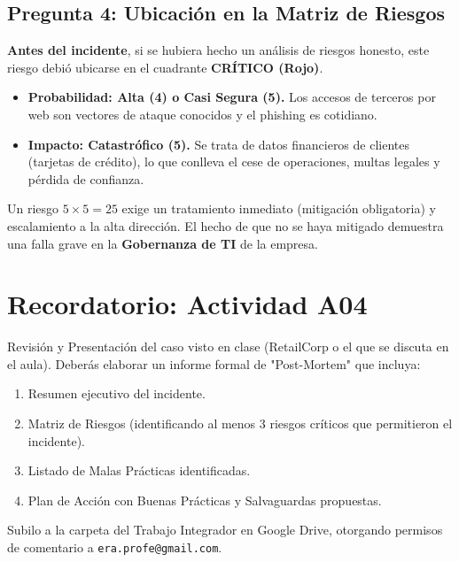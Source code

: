 \documentclass[11pt,a4paper]{article}
\begin{document}
\subsection*{Pregunta 4: Ubicación en la Matriz de Riesgos}
\begin{respuesta}
\textbf{Antes del incidente}, si se hubiera hecho un análisis de riesgos honesto, este riesgo debió ubicarse en el cuadrante \textbf{CRÍTICO (Rojo)}.
\begin{itemize}[leftmargin=*]
  \item \textbf{Probabilidad: Alta (4) o Casi Segura (5).} Los accesos de terceros por web son vectores de ataque conocidos y el phishing es cotidiano.
  \item \textbf{Impacto: Catastrófico (5).} Se trata de datos financieros de clientes (tarjetas de crédito), lo que conlleva el cese de operaciones, multas legales y pérdida de confianza.
\end{itemize}
Un riesgo $5 \times 5 = 25$ exige un tratamiento inmediato (mitigación obligatoria) y escalamiento a la alta dirección. El hecho de que no se haya mitigado demuestra una falla grave en la \textbf{Gobernanza de TI} de la empresa.
\end{respuesta}

\section{Recordatorio: Actividad A04}
\begin{clave}
Revisión y Presentación del caso visto en clase (RetailCorp o el que se discuta en el aula). 
Deberás elaborar un informe formal de "Post-Mortem" que incluya:
\begin{enumerate}
  \item Resumen ejecutivo del incidente.
  \item Matriz de Riesgos (identificando al menos 3 riesgos críticos que permitieron el incidente).
  \item Listado de Malas Prácticas identificadas.
  \item Plan de Acción con Buenas Prácticas y Salvaguardas propuestas.
\end{enumerate}
Subilo a la carpeta del Trabajo Integrador en Google Drive, otorgando permisos de comentario a \texttt{era.profe@gmail.com}.
\end{clave}
\end{document}
